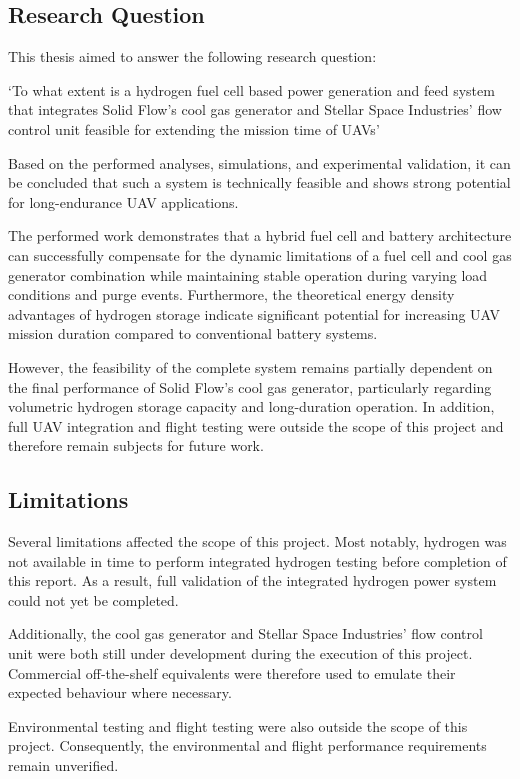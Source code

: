 \subsection*{Research Question}
This thesis aimed to answer the following research question:

`To what extent is a hydrogen fuel cell based power generation and feed system that integrates Solid Flow's cool gas generator and Stellar Space Industries' flow control unit feasible for extending the mission time of UAVs'

Based on the performed analyses, simulations, and experimental validation, it can be concluded that such a system is technically feasible and shows strong potential for long-endurance UAV applications.

The performed work demonstrates that a hybrid fuel cell and battery architecture can successfully compensate for the dynamic limitations of a fuel cell and cool gas generator combination while maintaining stable operation during varying load conditions and purge events. Furthermore, the theoretical energy density advantages of hydrogen storage indicate significant potential for increasing UAV mission duration compared to conventional battery systems.

However, the feasibility of the complete system remains partially dependent on the final performance of Solid Flow's cool gas generator, particularly regarding volumetric hydrogen storage capacity and long-duration operation. In addition, full UAV integration and flight testing were outside the scope of this project and therefore remain subjects for future work.


\subsection*{Limitations}
Several limitations affected the scope of this project. Most notably, hydrogen was not available in time to perform integrated hydrogen testing before completion of this report. As a result, full validation of the integrated hydrogen power system could not yet be completed.

Additionally, the cool gas generator and Stellar Space Industries' flow control unit were both still under development during the execution of this project. Commercial off-the-shelf equivalents were therefore used to emulate their expected behaviour where necessary.

Environmental testing and flight testing were also outside the scope of this project. Consequently, the environmental and flight performance requirements remain unverified.

